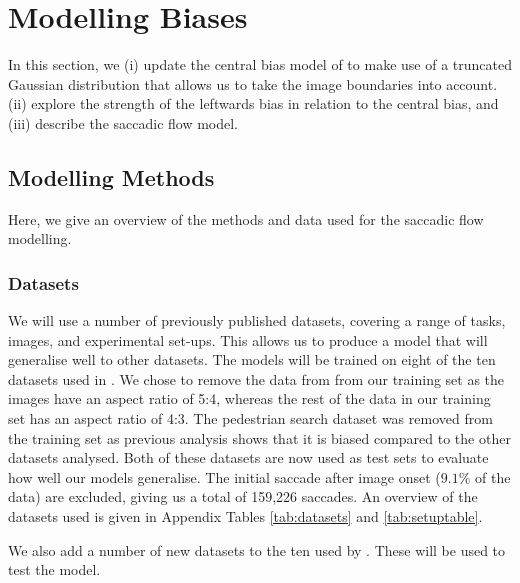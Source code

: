 
\section{Modelling Biases}
\label{sec:biases}

In this section, we (i) update the central bias model of \cite{clarke-tatler2014} to make use of a truncated Gaussian distribution that allows us to take the image boundaries into account. (ii) explore the strength of the leftwards bias in relation to the central bias, and (iii) describe the saccadic flow model. 


\subsection{Modelling Methods}
\label{sec:modellingMethods}

Here, we give an overview of the methods and data used for the saccadic flow modelling.

\subsubsection{Datasets}

We will use a number of previously published datasets, covering a range of tasks, images, and experimental set-ups. This allows us to produce a model that will generalise well to other datasets. The models will be trained on eight of the ten datasets used in \cite{clarke-tatler2014}. We chose to remove the data from \cite{asher2013} from our training set as the images have an aspect ratio of 5:4, whereas the rest of the data in our training set has an aspect ratio of 4:3. The pedestrian search dataset \citep{ehinger2009} was removed from the training set as previous analysis \citep{clarke-tatler2014} shows that it is biased compared to the other datasets analysed. Both of these datasets are now used as test sets to evaluate how well our models generalise. The initial saccade after image onset ($9.1\%$ of the data) are excluded, giving us a total of 159,226 saccades. An overview of the datasets used is given in Appendix Tables \ref{tab:datasets} and \ref{tab:setuptable}. 


We also add a number of new datasets to the ten used by \cite{clarke-tatler2014}. These will be used to test the model. 

